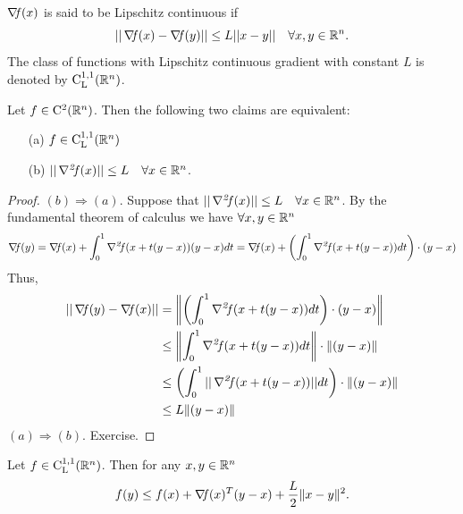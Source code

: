 \documentclass[10pt,a4paper]{article}
\begin{document}
\begin{definition}
	$\operatorname*{\mathit{\nabla \!f}}(x)$ is said to be Lipschitz continuous if 
	\begin{equation*}
		|| \operatorname*{\mathit{\nabla \!f}}(x) -\operatorname*{\mathit{\nabla \!f}}(y)|| \leq L ||x-y|| \quad \forall x,y \in \mathbb{R}^n.
	\end{equation*}
The class of functions with Lipschitz continuous gradient with constant $L$ is denoted by $\mathord{\mathrm{C^{1,1}_{L}}}(\mathbb{R}^n)$.
\end{definition}
\begin{theorem}
	Let $f\in\mathord{\mathrm{C^2}}(\mathbb{R}^n)$. Then the following two claims are equivalent:
	\begin{itemize}
		\item[(a)] $f\in \mathord{\mathrm{C^{1,1}_{L}}}(\mathbb{R}^n)$
		\item[(b)] $||\operatorname*{\mathit{\nabla^2 \!f}}(x)||\leq L \quad \forall x\in \mathbb{R}^n$.
	\end{itemize}
\begin{proof}
	$(b)\Rightarrow (a)$. Suppose that $||\operatorname*{\mathit{\nabla^2 \!f}}(x)||\leq L \quad \forall x\in \mathbb{R}^n$. By the fundamental theorem of calculus we have $\forall x,y \in \mathbb{R}^n$
	\begin{equation*}
		\begin{split}
			\operatorname*{\mathit{\nabla \!f}}(y)=\operatorname*{\mathit{\nabla \!f}}(x) + \int_{0}^{1} \operatorname*{\mathit{\nabla^2 \!f}}(x+t(y-x)) (y-x) dt = \operatorname*{\mathit{\nabla \!f}}(x) + \left(\int_{0}^{1} \operatorname*{\mathit{\nabla^2 \!f}}(x+t(y-x)) dt  \right) \cdot (y-x)
		\end{split}
	\end{equation*}
Thus, 
\begin{equation*}
	\begin{split}
		||\operatorname*{\mathit{\nabla \!f}}(y)-\operatorname*{\mathit{\nabla \!f}}(x)|| &= \left \| \left(\int_{0}^{1} \operatorname*{\mathit{\nabla^2 \!f}}(x+t(y-x)) dt  \right) \cdot (y-x)\right \|\\
		&\leq \left\|\int_{0}^{1} \operatorname*{\mathit{\nabla^2 \!f}}(x+t(y-x)) dt  \right\| \cdot \|(y-x) \|\\
		& \leq \left(\int_{0}^{1}|| \operatorname*{\mathit{\nabla^2 \!f}}(x+t(y-x))|| dt  \right)\cdot \|(y-x) \|\\
		& \leq L \|(y-x) \|
	\end{split}
\end{equation*}
	$(a)\Rightarrow (b)$. Exercise.
\end{proof}
\end{theorem}
\begin{lemma} Let $f\in \mathord{\mathrm{C^{1,1}_{L}}}(\mathbb{R}^n)$. Then for any $x,y \in \mathbb{R}^n$
	\begin{equation*}
		f(y) \leq f(x) + \operatorname*{\mathit{\nabla \!f}}(x)^T(y-x) + \frac{L}{2} \|x-y\|^2.
	\end{equation*}
\end{lemma}
\end{document}
